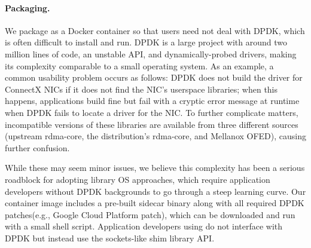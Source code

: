 \paragraph{Packaging.}
We package \mt{} as a Docker container so that users need not deal with DPDK, which is often difficult to install and run.
DPDK is a large project with around two million lines of code, an unstable API, and dynamically-probed drivers, making its complexity comparable to a small operating system.
As an example, a common usability problem occurs as follows: DPDK does not build the driver for ConnectX NICs if it does not find the NIC's userspace libraries; when this happens, applications build fine but fail with a cryptic error message at runtime when DPDK fails to locate a driver for the NIC.
To further complicate matters, incompatible versions of these libraries are available from three different sources (upstream rdma-core, the distribution's rdma-core, and Mellanox OFED), causing further confusion.

While these may seem minor issues, we believe this complexity has been a serious roadblock for adopting library OS approaches, which require application developers without DPDK backgrounds to go through a steep learning curve.
Our \mt{} container image includes a pre-built sidecar binary along with all required DPDK patches(e.g., Google Cloud Platform patch\cite{compute-virtual-ethernet-linux}), which can be downloaded and run with a small shell script.
Application developers using \mt{} do not interface with DPDK but instead use the sockets-like shim library API.

